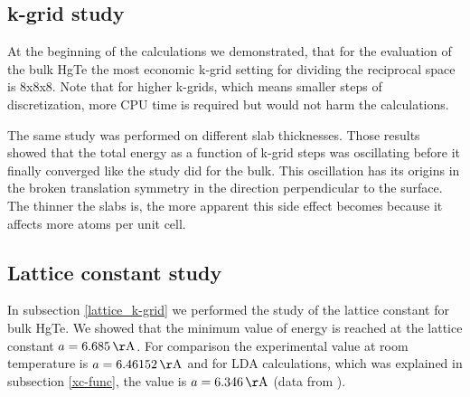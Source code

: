 \subsection{k-grid study}
	At the beginning of the calculations we demonstrated, that for the evaluation of the bulk HgTe the most economic k-grid setting for dividing the reciprocal space is 8x8x8. Note that for higher k-grids, which means smaller steps of discretization, more CPU time is required but would not harm the calculations. 
	
	The same study was performed on different slab thicknesses. Those results showed that the total energy as a function of k-grid steps was oscillating before it finally converged like the study did for the bulk. This oscillation has its origins in the broken translation symmetry in the direction perpendicular to the surface. The thinner the slabs is, the more apparent this side effect becomes because it affects more atoms per unit cell. 
%	
\subsection{Lattice constant study}	
	In subsection \ref{lattice_k-grid} we performed the study of the lattice constant for bulk HgTe. We showed that the minimum value of energy is reached at the lattice constant $a= 6.685 \,\unit{\AA}$. For comparison the experimental value at room temperature is $a=6.46152 \,\unit{\AA}$ and for LDA calculations, which was explained in subsection \ref{xc-func}, the value is $a= 6.346 \,\unit{\AA}$ (data from \cite{lattice_constant}).
	
